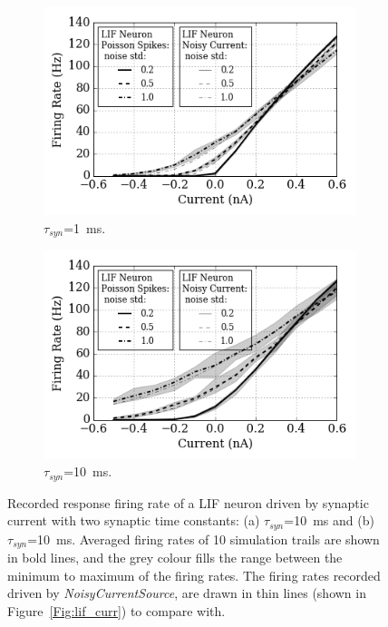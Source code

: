 	\begin{figure}[tbp!]
		\centering
		\begin{subfigure}[t]{0.49\textwidth}
			\includegraphics[width=\textwidth]{pics_iconip/spiked_curve_1.png}
			\caption{$\tau_{syn}$=1~ms.}
		\end{subfigure}
		\begin{subfigure}[t]{0.49\textwidth}
			\includegraphics[width=\textwidth]{pics_iconip/spiked_curve_10.png}
			\caption{$\tau_{syn}$=10~ms.}
		\end{subfigure}
		\caption{Recorded response firing rate of a LIF neuron driven by synaptic current with two synaptic time constants: (a) $\tau_{syn}$=10~ms and (b) $\tau_{syn}$=10~ms. Averaged firing rates of 10 simulation trails are shown in bold lines, and the grey colour fills the range between the minimum to maximum of the firing rates. The firing rates recorded driven by \textit{NoisyCurrentSource}, are drawn in thin lines (shown in Figure~\ref{Fig:lif_curr}) to compare with.}
		\label{Fig:spike_curr}
	\end{figure}
	

